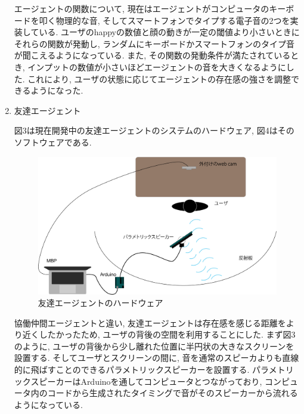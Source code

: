 \documentclass[a4paper,dvipdfmx]{hisken}
\begin{document}
\begin{enumerate}
エージェントの関数について, 現在はエージェントがコンピュータのキーボードを叩く物理的な音, そしてスマートフォンでタイプする電子音の2つを実装している.  ユーザのhappyの数値と顔の動きが一定の閾値より小さいときにそれらの関数が発動し, ランダムにキーボードかスマートフォンのタイプ音が聞こえるようになっている. また, その関数の発動条件が満たされているとき, インプットの数値が小さいほどエージェントの音を大きくなるようにした. これにより, ユーザの状態に応じてエージェントの存在感の強さを調整できるようになった.

\item 友達エージェント

図3は現在開発中の友達エージェントのシステムのハードウェア, 図4はそのソフトウェアである. 

\begin{figure}
  \includegraphics[width=\linewidth]{IntimateAgent_hardware.png}
  \caption{友達エージェントのハードウェア}
  \label{fig:detection}
\end{figure}

協働仲間エージェントと違い, 友達エージェントは存在感を感じる距離をより近くしたかったため, ユーザの背後の空間を利用することにした. まず図3のように, ユーザの背後から少し離れた位置に半円状の大きなスクリーンを設置する. そしてユーザとスクリーンの間に, 音を通常のスピーカよりも直線的に飛ばすことのできるパラメトリックスピーカーを設置する. パラメトリックスピーカーはArduinoを通してコンピュータとつながっており, コンピュータ内のコードから生成されたタイミングで音がそのスピーカーから流れるようになっている. 


\end{enumerate}
\end{document}
